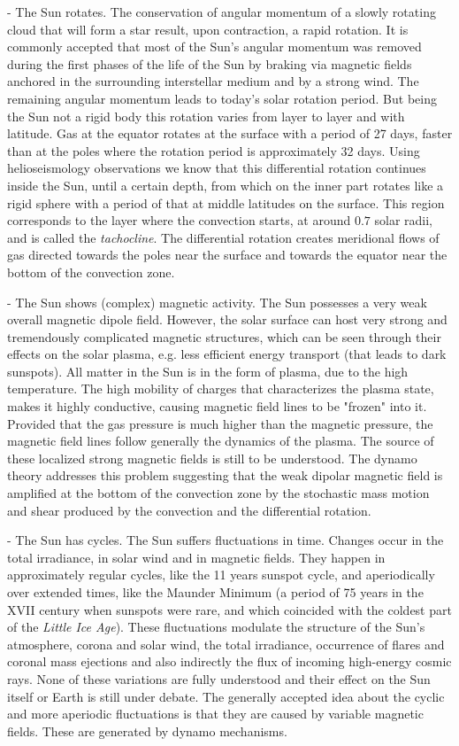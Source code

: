 - The Sun rotates. The conservation of angular momentum of a slowly rotating cloud that will form a star result, upon contraction, a rapid rotation. It is commonly accepted that most of the Sun's angular momentum was removed during the first phases of the life of  the Sun by braking via magnetic fields anchored in the surrounding interstellar medium and by a strong wind. The remaining angular momentum leads to today's solar rotation period. But being the Sun not a rigid body this rotation varies  from layer to layer and with latitude. Gas at the equator rotates at the surface with a period of 27 days, faster than at the poles where the rotation period is approximately 32 days. Using helioseismology observations we know that this differential rotation continues inside the Sun, until a certain depth, from which on the inner part rotates like a rigid sphere with a period of that at middle latitudes on the surface. This region corresponds to the layer where the convection starts, at around $0.7$ solar radii, and is called the \emph{tachocline}. The differential rotation creates meridional flows of gas directed towards the poles near the surface and towards the equator near the bottom of the convection zone.

- The Sun shows (complex) magnetic activity. The Sun possesses a very weak overall magnetic dipole field. However, the solar surface can host very strong and tremendously complicated magnetic structures, which can be seen through their effects on the solar plasma, e.g. less efficient energy transport (that leads to dark sunspots). All matter in the Sun is in the form of plasma, due to the high temperature.  The high mobility of charges that characterizes the plasma state, makes it highly conductive, causing magnetic field lines to be "frozen" into it. Provided that the gas pressure  is much higher than the magnetic pressure, the magnetic field lines follow generally the dynamics of the plasma. The source of these localized strong magnetic fields is still to be understood. The dynamo theory addresses this problem suggesting that the weak dipolar magnetic field is amplified at the bottom of the convection zone by the stochastic mass motion and shear produced by the convection and the differential rotation.

- The Sun has cycles. The Sun suffers fluctuations in time. Changes occur in the total irradiance, in solar wind and in magnetic fields. They happen in approximately regular cycles, like the 11 years sunspot cycle, and aperiodically over extended times, like the Maunder Minimum (a period of 75 years in the XVII century when sunspots were rare, and which coincided with the coldest part of the \emph{Little Ice Age}). These fluctuations modulate the structure of the Sun's atmosphere, corona and solar wind, the total irradiance, occurrence of flares and coronal mass ejections and also indirectly the flux of incoming high-energy cosmic rays. None of these variations are fully understood and their effect on the Sun itself or Earth is still under debate.  The generally accepted idea about the cyclic and more aperiodic fluctuations is that they are caused by variable magnetic fields. These are generated by dynamo mechanisms.

